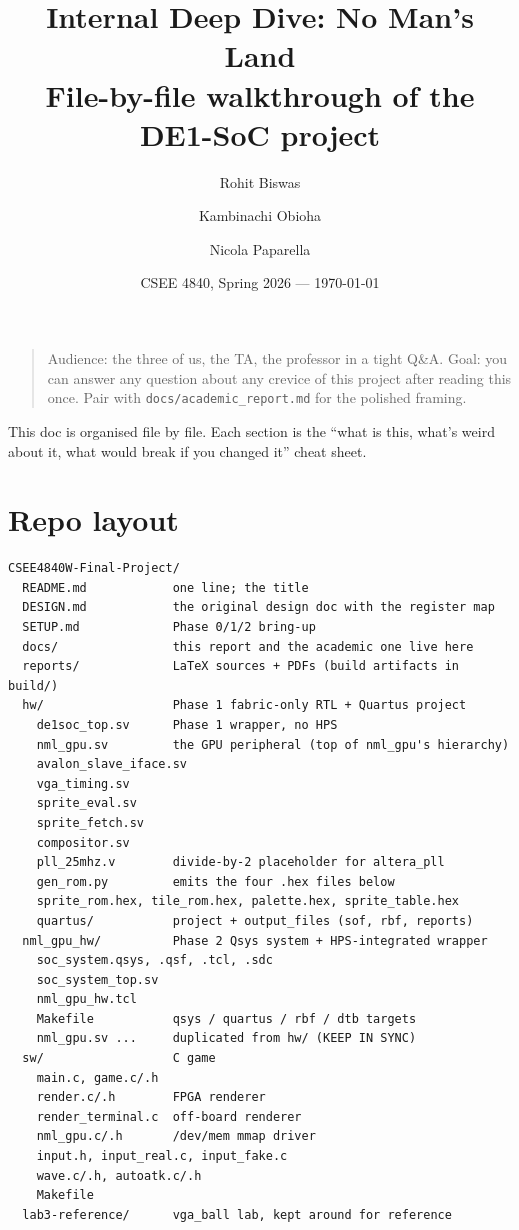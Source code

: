 \documentclass[11pt,letterpaper]{article}
\title{\textbf{Internal Deep Dive: No Man's Land}\\[0.3em]
\large File-by-file walkthrough of the DE1-SoC project}
\author{Rohit Biswas \and Kambinachi Obioha \and Nicola Paparella}
\date{CSEE 4840, Spring 2026 --- \today}
\begin{document}
\maketitle

\begin{quote}
Audience: the three of us, the TA, the professor in a tight Q\&A. Goal: you
can answer any question about any crevice of this project after reading this
once. Pair with \texttt{docs/academic\_report.md} for the polished framing.
\end{quote}

This doc is organised file by file. Each section is the ``what is this,
what's weird about it, what would break if you changed it'' cheat sheet.

\tableofcontents
\newpage

\section{Repo layout}

\begin{lstlisting}[style=plain]
CSEE4840W-Final-Project/
  README.md            one line; the title
  DESIGN.md            the original design doc with the register map
  SETUP.md             Phase 0/1/2 bring-up
  docs/                this report and the academic one live here
  reports/             LaTeX sources + PDFs (build artifacts in build/)
  hw/                  Phase 1 fabric-only RTL + Quartus project
    de1soc_top.sv      Phase 1 wrapper, no HPS
    nml_gpu.sv         the GPU peripheral (top of nml_gpu's hierarchy)
    avalon_slave_iface.sv
    vga_timing.sv
    sprite_eval.sv
    sprite_fetch.sv
    compositor.sv
    pll_25mhz.v        divide-by-2 placeholder for altera_pll
    gen_rom.py         emits the four .hex files below
    sprite_rom.hex, tile_rom.hex, palette.hex, sprite_table.hex
    quartus/           project + output_files (sof, rbf, reports)
  nml_gpu_hw/          Phase 2 Qsys system + HPS-integrated wrapper
    soc_system.qsys, .qsf, .tcl, .sdc
    soc_system_top.sv
    nml_gpu_hw.tcl
    Makefile           qsys / quartus / rbf / dtb targets
    nml_gpu.sv ...     duplicated from hw/ (KEEP IN SYNC)
  sw/                  C game
    main.c, game.c/.h
    render.c/.h        FPGA renderer
    render_terminal.c  off-board renderer
    nml_gpu.c/.h       /dev/mem mmap driver
    input.h, input_real.c, input_fake.c
    wave.c/.h, autoatk.c/.h
    Makefile
  lab3-reference/      vga_ball lab, kept around for reference
\end{lstlisting}
\end{document}
